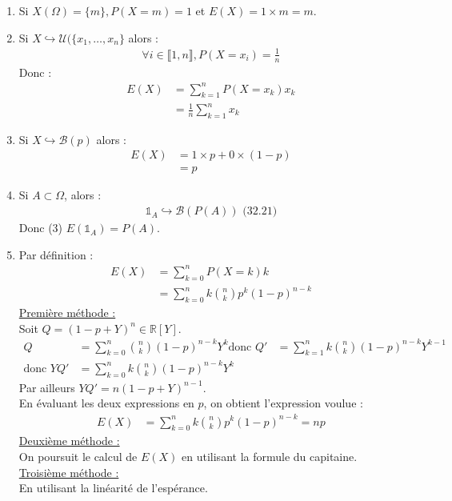 \documentclass[../main.tex]{subfiles}
\begin{document}
\begin{enumerate}
    \item Si $X(\Omega) = \{m\}, P(X=m)=1$ et $E(X) = 1\times m = m$. 
    \item Si $X\hookrightarrow \mathcal{U}(\{x_1, \ldots, x_n\}$ alors : 
    \begin{align*}
        \forall i\in \llbracket 1, n \rrbracket, P(X = x_i) = \frac{1}{n}
    \end{align*}
    Donc :
    \begin{align*}
        E(X) &= \sum_{k=1}^{n} P(X = x_k) x_k \\
        &= \frac{1}{n} \sum_{k=1}^{n} x_k
    \end{align*}
    \item Si $X\hookrightarrow \mathcal{B}(p)$ alors :
    \begin{align*}
        E(X) &= 1\times p + 0\times (1-p) \\
        &= p
    \end{align*}
    \item Si $A\subset \Omega$, alors : 
    \begin{align*}
        \mathbb{1}_A\hookrightarrow \mathcal{B}(P(A)) \text{ (32.21)}
    \end{align*}
    Donc (3) $E(\mathbb{1}_A) = P(A)$.
    \item Par définition : 
    \begin{align*}
        E(X) &= \sum_{k=0}^{n} P(X = k) k \\
        &= \sum_{k=0}^{n} k \binom{n}{k} p^k (1-p)^{n-k}
    \end{align*}
    \underline{Première méthode :} \\
    Soit $Q = (1-p + Y)^n\in \mathbb{R}[Y]$. 
    \begin{align*}
        Q &= \sum_{k=0}^{n} \binom{n}{k} (1-p)^{n-k} Y^k
        \text{donc } Q' &= \sum_{k=1}^{n} k \binom{n}{k} (1-p)^{n-k} Y^{k-1} \\
        \text{donc } YQ' &= \sum_{k=0}^{n} k \binom{n}{k} (1-p)^{n-k} Y^k
    \end{align*}
    Par ailleurs $YQ' = n(1-p + Y)^{n-1}$. \\
    En évaluant les deux expressions en $p$, on obtient l'expression voulue : 
    \begin{align*}
        E(X) &= \sum_{k=0}^{n} k \binom{n}{k} p^k (1-p)^{n-k} = np
    \end{align*}
    \underline{Deuxième méthode :} \\
    On poursuit le calcul de $E(X)$ en utilisant la formule du capitaine. \\
    \underline{Troisième méthode :} \\
    En utilisant la linéarité de l'espérance. 
\end{enumerate}
\end{document}
